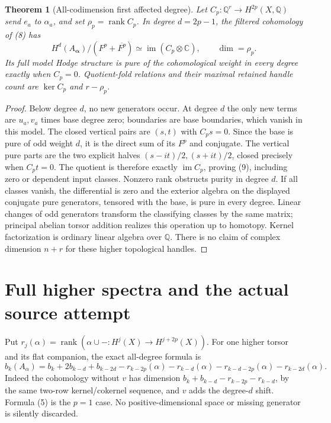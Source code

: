 \documentclass[11pt]{article}
\newtheorem{theorem}{Theorem}
\newcommand{\Q}{\mathbb Q}
\newcommand{\C}{\mathbb C}
\newcommand{\rk}{\operatorname{rank}}
\newcommand{\im}{\operatorname{im}}
\begin{document}
\begin{theorem}[All-codimension first affected degree]
Let $C_p:\Q^r\to H^{2p}(X,\Q)$ send $e_a$ to $\alpha_a$, and set
$\rho_p=\rk C_p$. In degree $d=2p-1$, the filtered cohomology of (8) has
\[
 H^d(A_{\boldsymbol\alpha})/(F^p+\overline{F^p})
       \simeq \im (C_p\otimes\C),\qquad \dim=\rho_p.                   \tag{9}
\]
Its full model Hodge structure is pure of the cohomological weight in every
degree exactly when $C_p=0$. Quotient-fold relations and their maximal
retained handle count are $\ker C_p$ and $r-\rho_p$.
\end{theorem}
\begin{proof}
Below degree $d$, no new generators occur. At degree $d$ the only new
terms are $u_a,v_a$ times base degree zero; boundaries are base boundaries,
which vanish in this model. The closed vertical pairs are $(s,t)$ with
$C_ps=0$. Since the base is pure of odd weight $d$, it is the direct sum
of its $F^p$ and conjugate. The vertical pure parts are the two explicit
halves $(s-it)/2,(s+it)/2$, closed precisely when $C_pt=0$.
The quotient is therefore exactly $\im C_p$, proving (9), including
zero or dependent input classes. Nonzero rank obstructs purity in degree
$d$. If all classes vanish, the differential is zero and the exterior
algebra on the displayed conjugate pure generators, tensored with the base,
is pure in every degree. Linear changes of odd generators transform the
classifying classes by the same matrix; principal abelian torsor addition
realizes this operation up to homotopy. Kernel factorization is ordinary
linear algebra over $\Q$. There is no claim of complex dimension $n+r$
for these higher topological handles.
\end{proof}

\section{Full higher spectra and the actual source attempt}
Put $r_j(\alpha)=\rk(\alpha\cup-:H^j(X)\to H^{j+2p}(X))$.
For one higher torsor and its flat companion, the exact all-degree formula is
\[
 b_k(A_\alpha)=b_k+2b_{k-d}+b_{k-2d}
 -r_{k-2p}(\alpha)-r_{k-d}(\alpha)
 -r_{k-d-2p}(\alpha)-r_{k-2d}(\alpha).                              \tag{10}
\]
Indeed the cohomology without $v$ has dimension
$b_k+b_{k-d}-r_{k-2p}-r_{k-d}$, by the same two-row kernel/cokernel
sequence, and $v$ adds the degree-$d$ shift. Formula (5) is the $p=1$ case.
No positive-dimensional space or missing generator is silently discarded.
\end{document}
